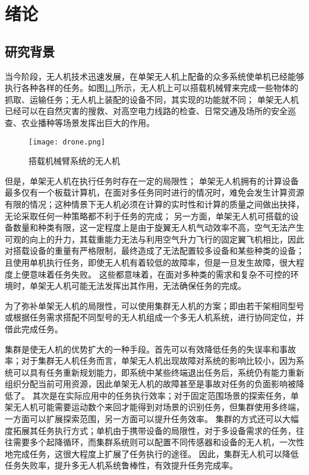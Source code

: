 \renewcommand{\baselinestretch}{1.5}
\fontsize{12pt}{13pt}\selectfont

\chapter{绪论}\label{preface}

\section{研究背景}

当今阶段，无人机技术迅速发展，在单架无人机上配备的众多系统使单机已经能够执行各种各样的任务。如图\ref{fig-drone}所示，无人机上可以搭载机械臂来完成一些物体的抓取、运输任务；无人机上装配的设备不同，其实现的功能就不同；
单架无人机已经可以在自然灾害的搜救、对高空电力线路的检查、日常交通及场所的安全巡查、农业播种等场景发挥出巨大的作用。
~\\
\begin{figure}[!ht]
	\centering
	\texttt{[image: drone.png]}
	\caption{搭载机械臂系统的无人机} 
	\label{fig-drone}
\end{figure}

但是，单架无人机在执行任务时存在一定的局限性；
单架无人机拥有的计算设备最多仅有一个板载计算机，在面对多任务同时进行的情况时，难免会发生计算资源有限的情况；这种情景下无人机必须在计算的实时性和计算的质量之间做出抉择，无论采取任何一种策略都不利于任务的完成；
另一方面，单架无人机可搭载的设备数量和种类有限，这一定程度上是由于旋翼无人机气动效率不高，空气无法产生可观的向上的升力，其载重能力无法与利用空气升力飞行的固定翼飞机相比，因此对搭载设备的重量有严格限制，最终造成了无法配置较多设备和某些种类的设备；
且使用单机执行任务，即使无人机有着较低的故障率，但是一旦发生故障，很大程度上便意味着任务失败。
这些都意味着，在面对多种类的需求和复杂不可控的环境时，单架无人机可能无法发挥出其作用，无法确保任务的完成。

为了弥补单架无人机的局限性，可以使用集群无人机的方案；即由若干架相同型号或根据任务需求搭配不同型号的无人机组成一个多无人机系统，进行协同定位，并借此完成任务。

集群是使无人机的优势扩大的一种手段。首先可以有效降低任务的失误率和事故率；对于集群无人机任务而言，单架无人机出现故障对系统的影响比较小，因为系统可以具有任务重新规划能力，即系统中某些终端退出任务后，系统仍有能力重新组织分配当前可用资源，因此单架无人机的故障甚至是事故对任务的负面影响被降低了。
其次是在实际应用中的任务执行效率；对于固定范围场景的探索任务，单架无人机可能需要运动数个来回才能得到对场景的识别任务，但集群使用多终端，一方面可以扩展探索范围，另一方面可以提升任务效率。
集群的方式还可以大幅度拓展其任务执行方式；单机由于携带设备的局限性，对于多设备需求的任务，往往需要多个起降循环，而集群系统则可以配置不同传感器和设备的无人机，一次性地完成任务，这很大程度上扩展了任务执行的途径。
因此，集群无人机可以降低任务失败率，提升多无人机系统鲁棒性，有效提升任务完成率。

